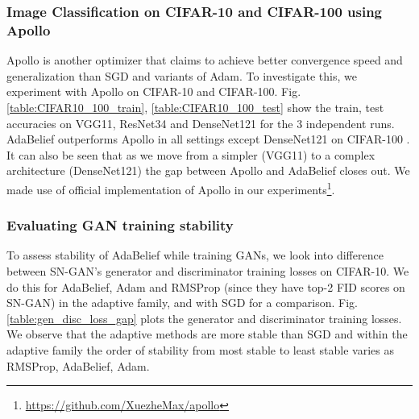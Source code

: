 \subsubsection{Image Classification on CIFAR-10 and CIFAR-100 using Apollo}
Apollo \cite{Apollo} is another optimizer that claims to achieve better convergence speed and generalization than SGD and variants of Adam. To investigate this, we experiment with Apollo on CIFAR-10 and CIFAR-100. Fig. \ref{table:CIFAR10_100_train}, \ref{table:CIFAR10_100_test} show the train, test accuracies on VGG11, ResNet34 and DenseNet121 for the 3 independent runs. AdaBelief outperforms Apollo in all settings except DenseNet121 on CIFAR-100 . It can also be seen that as we move from a simpler (VGG11) to a complex architecture (DenseNet121) the gap between Apollo and AdaBelief closes out. We made use of official implementation of Apollo in our experiments\footnote{\href{https://github.com/XuezheMax/apollo}{https://github.com/XuezheMax/apollo}}.



\subsubsection{ Evaluating GAN training stability} 
\label{lab:training_stability}
To assess stability of AdaBelief while training GANs, we look into difference between SN-GAN's generator and discriminator training losses on CIFAR-10. We do this for AdaBelief, Adam and RMSProp (since they have top-2 FID scores on SN-GAN) in the adaptive family, and with SGD for a comparison. Fig. \ref{table:gen_disc_loss_gap} plots the generator and discriminator training losses. We observe that the adaptive methods are more stable than SGD and within the adaptive family the order of stability from most stable to least stable varies as RMSProp, AdaBelief, Adam.

